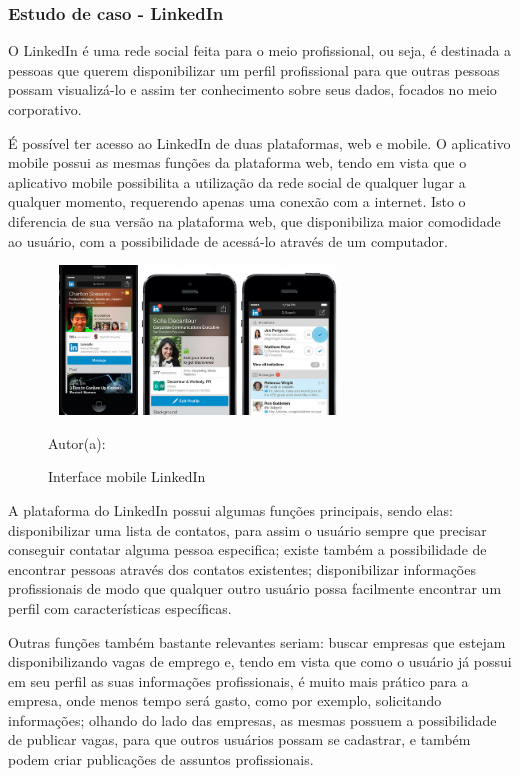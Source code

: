 \subsubsection{Estudo de caso - LinkedIn}

O LinkedIn é uma rede social feita para o meio profissional, ou seja, é destinada a pessoas que querem disponibilizar um perfil profissional para que outras pessoas possam visualizá-lo e assim ter conhecimento sobre seus dados, focados no meio corporativo.

É possível ter acesso ao LinkedIn de duas plataformas, web e mobile. O aplicativo mobile possui as mesmas funções da plataforma web, tendo em vista que o aplicativo mobile possibilita a utilização da rede social de qualquer lugar a qualquer momento, requerendo apenas uma conexão com a internet. Isto o diferencia de sua versão na plataforma web, que disponibiliza maior comodidade ao usuário, com a possibilidade de acessá-lo através de um computador. 

\begin{figure}[!h]
	\centering
	\caption{Interface mobile LinkedIn}
	\includegraphics[width=300px, height=150px]{./images/linkedinMobile.png}
	\par {Autor(a): \cite{linkedin-b}}
\end{figure}
\newpage
A plataforma do LinkedIn possui algumas funções principais, sendo elas: disponibilizar uma lista de contatos, para assim o usuário sempre que precisar conseguir contatar alguma pessoa especifica; existe também a possibilidade de encontrar pessoas através dos contatos existentes; disponibilizar informações profissionais de modo que qualquer outro usuário possa facilmente encontrar um perfil com características específicas.

Outras funções também bastante relevantes seriam: buscar empresas que estejam disponibilizando vagas de emprego e, tendo em vista que como o usuário já possui em seu perfil as suas informações profissionais, é muito mais prático para a empresa, onde menos tempo será gasto, como por exemplo, solicitando informações; olhando do lado das empresas, as mesmas possuem a possibilidade de publicar vagas, para que outros usuários possam se cadastrar, e também podem criar publicações de assuntos profissionais.

